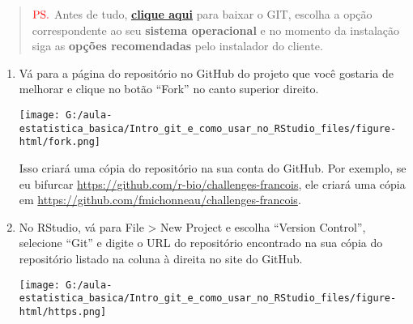 \documentclass[]{book}
\begin{document}
\begin{quote}
\(\color{red}{\text{PS.}}\) Antes de tudo, \href{https://git-scm.com/downloads}{\textbf{clique aqui}} para baixar o GIT, escolha a opção correspondente ao seu \textbf{sistema operacional} e no momento da instalação siga as \textbf{opções recomendadas} pelo instalador do cliente.
\end{quote}

\begin{enumerate}
\def\labelenumi{\arabic{enumi}.}
\item
  Vá para a página do repositório no GitHub do projeto que você gostaria de melhorar e clique no botão ``Fork'' no canto superior direito.

  \texttt{[image: G:/aula-estatistica\_basica/Intro\_git\_e\_como\_usar\_no\_RStudio\_files/figure-html/fork.png]}

  Isso criará uma cópia do repositório na sua conta do GitHub. Por exemplo, se eu bifurcar \url{https://github.com/r-bio/challenges-francois}, ele criará uma cópia em \url{https://github.com/fmichonneau/challenges-francois}.
\item
  No RStudio, vá para File \textgreater{} New Project e escolha ``Version Control'', selecione ``Git'' e digite o URL do repositório encontrado na sua cópia do repositório listado na coluna à direita no site do GitHub.

  \texttt{[image: G:/aula-estatistica\_basica/Intro\_git\_e\_como\_usar\_no\_RStudio\_files/figure-html/https.png]}


\end{enumerate}
\end{document}
